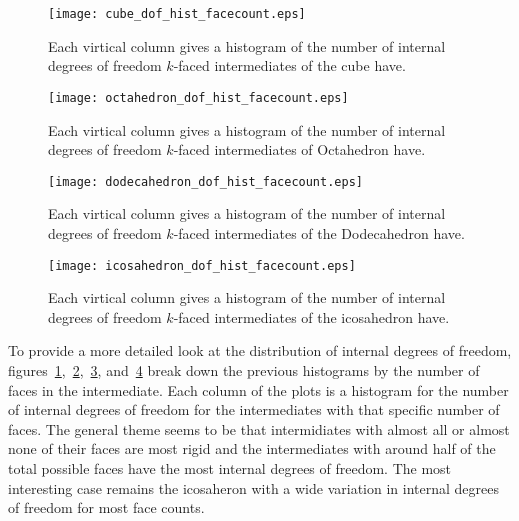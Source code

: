 \begin{figure}[ht]
\centering
  \texttt{[image: cube\_dof\_hist\_facecount.eps]}
\caption{Each virtical column gives a histogram of the number of internal degrees of freedom $k$-faced intermediates of the cube have.}
\label{fig:CubeDoFHistFC}
\end{figure}

\begin{figure}[ht]
\centering
  \texttt{[image: octahedron\_dof\_hist\_facecount.eps]}
\caption{Each virtical column gives a histogram of the number of internal degrees of freedom $k$-faced intermediates of Octahedron have.}
\label{fig:OctaDoFHistFC}
\end{figure}

\begin{figure}[ht]
\centering
  \texttt{[image: dodecahedron\_dof\_hist\_facecount.eps]}
\caption{Each virtical column gives a histogram of the number of internal degrees of freedom $k$-faced intermediates of the Dodecahedron have.}
\label{fig:DodecDoFHistFC}
\end{figure}

\begin{figure}[ht]
\centering
\texttt{[image: icosahedron\_dof\_hist\_facecount.eps]}
\caption{Each virtical column gives a histogram of the number of internal degrees of freedom $k$-faced intermediates of the icosahedron have.}
\label{fig:IcosaDoFHistFC}
\end{figure}

To provide a more detailed look at the distribution of internal degrees of freedom, figures~\ref{fig:CubeDoFHistFC},~\ref{fig:OctaDoFHistFC},~\ref{fig:DodecDoFHistFC}, and~\ref{fig:IcosaDoFHistFC} break down the previous histograms by the number of faces in the intermediate. Each column of the plots is a histogram for the number of internal degrees of freedom for the intermediates with that specific number of faces. The general theme seems to be that intermidiates with almost all or almost none of their faces are most rigid and the intermediates with around half of the total possible faces have the most internal degrees of freedom. The most interesting case remains the icosaheron with a wide variation in internal degrees of freedom for most face counts.

